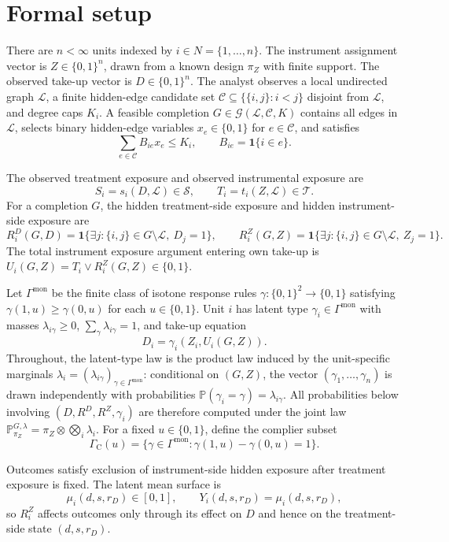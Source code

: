 \documentclass[11pt]{article}
\renewcommand{\Pr}{\mathbb{P}}
\newcommand{\one}{\mathbf{1}}
\newcommand{\calG}{\mathcal{G}}
\theoremstyle{definition}
\theoremstyle{plain}
\theoremstyle{remark}
\begin{document}
\section{Formal setup}
There are \(n<\infty\) units indexed by \(i\in N=\{1,\ldots,n\}\). The
instrument assignment vector is \(Z\in\{0,1\}^n\), drawn from a known design
\(\pi_Z\) with finite support. The observed take-up vector is
\(D\in\{0,1\}^n\). The analyst observes a local undirected graph
\(\mathcal L\), a finite hidden-edge candidate set
\(\mathcal C\subseteq\{\{i,j\}:i<j\}\) disjoint from \(\mathcal L\), and degree
caps \(K_i\). A feasible completion \(G\in\calG(\mathcal L,\mathcal C,K)\)
contains all edges in \(\mathcal L\), selects binary hidden-edge variables
\(x_e\in\{0,1\}\) for \(e\in\mathcal C\), and satisfies
\[
\sum_{e\in\mathcal C} B_{ie}x_e\le K_i,\qquad
B_{ie}=\one\{i\in e\}.
\]

The observed treatment exposure and observed instrumental exposure are
\[
S_i=s_i(D,\mathcal L)\in\mathcal S,\qquad
T_i=t_i(Z,\mathcal L)\in\mathcal T.
\]
For a completion \(G\), the hidden treatment-side exposure and hidden
instrument-side exposure are
\[
R_i^D(G,D)=
\one\{\exists j:\{i,j\}\in G\setminus\mathcal L,\ D_j=1\},
\qquad
R_i^Z(G,Z)=
\one\{\exists j:\{i,j\}\in G\setminus\mathcal L,\ Z_j=1\}.
\]
The total instrument exposure argument entering own take-up is
\(U_i(G,Z)=T_i\vee R_i^Z(G,Z)\in\{0,1\}\).

Let \(\Gamma^{\mathrm{mon}}\) be the finite class of isotone response rules
\(\gamma:\{0,1\}^2\to\{0,1\}\) satisfying
\(\gamma(1,u)\ge \gamma(0,u)\) for each \(u\in\{0,1\}\). Unit \(i\) has latent
type \(\gamma_i\in\Gamma^{\mathrm{mon}}\) with masses
\(\lambda_{i\gamma}\ge0\), \(\sum_{\gamma}\lambda_{i\gamma}=1\), and take-up
equation
\[
D_i=\gamma_i(Z_i,U_i(G,Z)).
\]
Throughout, the latent-type law is the product law induced by the unit-specific
marginals \(\lambda_i=(\lambda_{i\gamma})_{\gamma\in\Gamma^{\mathrm{mon}}}\):
conditional on \((G,Z)\), the vector \((\gamma_1,\ldots,\gamma_n)\) is drawn
independently with probabilities \(\Pr(\gamma_i=\gamma)=\lambda_{i\gamma}\).
All probabilities below involving \((D,R^D,R^Z,\gamma_i)\) are therefore
computed under the joint law \(\Pr^{G,\lambda}_{\pi_Z}=\pi_Z\otimes
\bigotimes_i\lambda_i\).
For a fixed \(u\in\{0,1\}\), define the complier subset
\[
\Gamma_{\mathrm{C}}(u)=
\{\gamma\in\Gamma^{\mathrm{mon}}:\gamma(1,u)-\gamma(0,u)=1\}.
\]

Outcomes satisfy exclusion of instrument-side hidden exposure after treatment
exposure is fixed. The latent mean surface is
\[
\mu_i(d,s,r_D)\in[0,1],\qquad
Y_i(d,s,r_D)=\mu_i(d,s,r_D),
\]
so \(R_i^Z\) affects outcomes only through its effect on \(D\) and hence on the
treatment-side state \((d,s,r_D)\).
\end{document}

